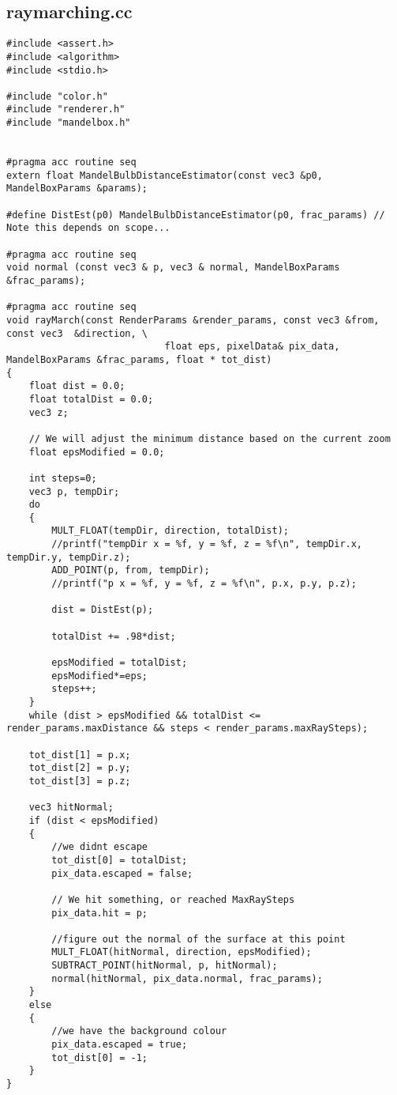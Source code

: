 \documentclass[]{article}
\begin{document}
\subsection*{raymarching.cc}
\begin{Verbatim}[fontsize= \footnotesize, tabsize=4]
#include <assert.h>
#include <algorithm>
#include <stdio.h>

#include "color.h"
#include "renderer.h"
#include "mandelbox.h"


#pragma acc routine seq
extern float MandelBulbDistanceEstimator(const vec3 &p0, MandelBoxParams &params);

#define DistEst(p0) MandelBulbDistanceEstimator(p0, frac_params) // Note this depends on scope...

#pragma acc routine seq
void normal (const vec3 & p, vec3 & normal, MandelBoxParams &frac_params);

#pragma acc routine seq
void rayMarch(const RenderParams &render_params, const vec3 &from, const vec3  &direction, \
							float eps, pixelData& pix_data, MandelBoxParams &frac_params, float * tot_dist)
{
	float dist = 0.0;
	float totalDist = 0.0;
	vec3 z;

	// We will adjust the minimum distance based on the current zoom
	float epsModified = 0.0;

	int steps=0;
	vec3 p, tempDir;
	do
	{
		MULT_FLOAT(tempDir, direction, totalDist);
		//printf("tempDir x = %f, y = %f, z = %f\n", tempDir.x, tempDir.y, tempDir.z);
		ADD_POINT(p, from, tempDir);
		//printf("p x = %f, y = %f, z = %f\n", p.x, p.y, p.z);

		dist = DistEst(p);

		totalDist += .98*dist;

		epsModified = totalDist;
		epsModified*=eps;
		steps++;
	}
	while (dist > epsModified && totalDist <= render_params.maxDistance && steps < render_params.maxRaySteps);

	tot_dist[1] = p.x;
	tot_dist[2] = p.y;
	tot_dist[3] = p.z;

	vec3 hitNormal;
	if (dist < epsModified)
	{
		//we didnt escape
		tot_dist[0] = totalDist;
		pix_data.escaped = false;

		// We hit something, or reached MaxRaySteps
		pix_data.hit = p;

		//figure out the normal of the surface at this point
		MULT_FLOAT(hitNormal, direction, epsModified);
		SUBTRACT_POINT(hitNormal, p, hitNormal);
		normal(hitNormal, pix_data.normal, frac_params);
	}
	else
	{
		//we have the background colour
		pix_data.escaped = true;
		tot_dist[0] = -1;
	}
}


\end{Verbatim}
\end{document}
